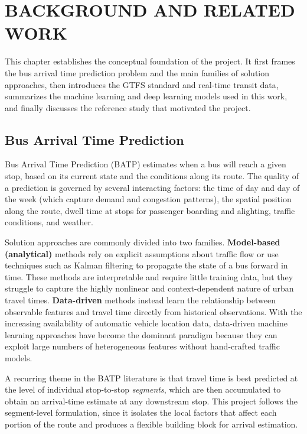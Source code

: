 \chapter{BACKGROUND AND RELATED WORK}

This chapter establishes the conceptual foundation of the project. It first frames the bus arrival time prediction problem and the main families of solution approaches, then introduces the GTFS standard and real-time transit data, summarizes the machine learning and deep learning models used in this work, and finally discusses the reference study that motivated the project.

\section{Bus Arrival Time Prediction}

Bus Arrival Time Prediction (BATP) estimates when a bus will reach a given stop, based on its current state and the conditions along its route. The quality of a prediction is governed by several interacting factors: the time of day and day of the week (which capture demand and congestion patterns), the spatial position along the route, dwell time at stops for passenger boarding and alighting, traffic conditions, and weather.

Solution approaches are commonly divided into two families. \textbf{Model-based (analytical)} methods rely on explicit assumptions about traffic flow or use techniques such as Kalman filtering to propagate the state of a bus forward in time. These methods are interpretable and require little training data, but they struggle to capture the highly nonlinear and context-dependent nature of urban travel times. \textbf{Data-driven} methods instead learn the relationship between observable features and travel time directly from historical observations. With the increasing availability of automatic vehicle location data, data-driven machine learning approaches have become the dominant paradigm because they can exploit large numbers of heterogeneous features without hand-crafted traffic models.

A recurring theme in the BATP literature is that travel time is best predicted at the level of individual stop-to-stop \emph{segments}, which are then accumulated to obtain an arrival-time estimate at any downstream stop. This project follows the segment-level formulation, since it isolates the local factors that affect each portion of the route and produces a flexible building block for arrival estimation.


